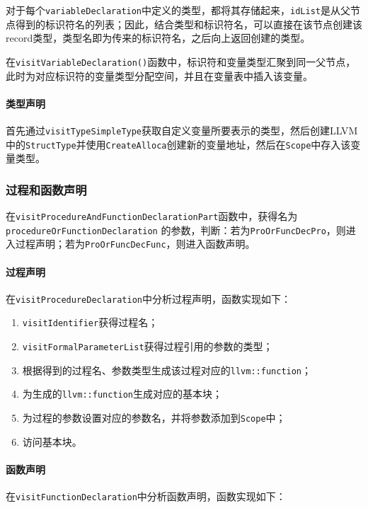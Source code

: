 \documentclass[lang=cn,11pt,a4paper,cite=authornum]{paper}
\begin{document}
对于每个\texttt{variableDeclaration}中定义的类型，都将其存储起来，\texttt{idList}是从父节点得到的标识符名的列表；因此，结合类型和标识符名，可以直接在该节点创建该record类型，类型名即为传来的标识符名，之后向上返回创建的类型。

在\texttt{visitVariableDeclaration()}函数中，标识符和变量类型汇聚到同一父节点，此时为对应标识符的变量类型分配空间，并且在变量表中插入该变量。

\paragraph{类型声明}

首先通过\texttt{visitTypeSimpleType}获取自定义变量所要表示的类型，然后创建LLVM中的\texttt{StructType}并使用\texttt{CreateAlloca}创建新的变量地址，然后在\texttt{Scope}中存入该变量类型。

\subsubsection{过程和函数声明}

在\texttt{visitProcedureAndFunctionDeclarationPart}函数中，获得名为 \texttt{procedureOrFunctionDeclaration} 的参数，判断：若为\texttt{ProOrFuncDecPro}，则进入过程声明；若为\texttt{ProOrFuncDecFunc}，则进入函数声明。

\paragraph{过程声明} 在\texttt{visitProcedureDeclaration}中分析过程声明，函数实现如下：

\begin{enumerate}
    \item \texttt{visitIdentifier}获得过程名；
    \item \texttt{visitFormalParameterList}获得过程引用的参数的类型；
    \item 根据得到的过程名、参数类型生成该过程对应的\texttt{llvm::function}；
    \item 为生成的\texttt{llvm::function}生成对应的基本块；
    \item 为过程的参数设置对应的参数名，并将参数添加到\texttt{Scope}中；
    \item 访问基本块。 
\end{enumerate}

\paragraph{函数声明} 在\texttt{visitFunctionDeclaration}中分析函数声明，函数实现如下：
\end{document}
